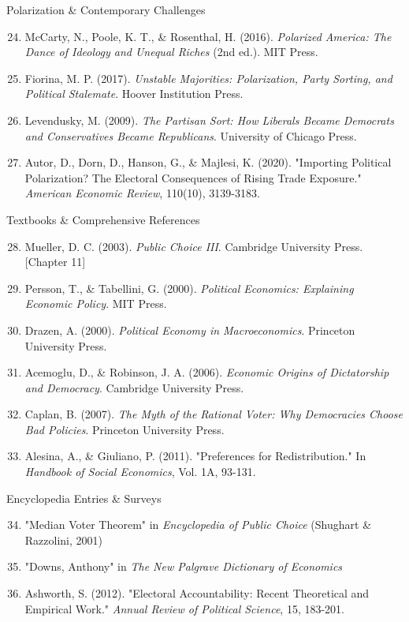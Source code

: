 \documentclass[10pt]{beamer}
\begin{document}
\begin{frame}{Polarization \& Contemporary Challenges}
\footnotesize
\begin{enumerate}
\setcounter{enumi}{23}
\item McCarty, N., Poole, K. T., \& Rosenthal, H. (2016). \emph{Polarized America: The Dance of Ideology and Unequal Riches} (2nd ed.). MIT Press.
\item Fiorina, M. P. (2017). \emph{Unstable Majorities: Polarization, Party Sorting, and Political Stalemate}. Hoover Institution Press.
\item Levendusky, M. (2009). \emph{The Partisan Sort: How Liberals Became Democrats and Conservatives Became Republicans}. University of Chicago Press.
\item Autor, D., Dorn, D., Hanson, G., \& Majlesi, K. (2020). "Importing Political Polarization? The Electoral Consequences of Rising Trade Exposure." \emph{American Economic Review}, 110(10), 3139-3183.
\end{enumerate}
\end{frame}

\begin{frame}{Textbooks \& Comprehensive References}
\footnotesize
\begin{enumerate}
\setcounter{enumi}{27}
\item Mueller, D. C. (2003). \emph{Public Choice III}. Cambridge University Press. [Chapter 11]
\item Persson, T., \& Tabellini, G. (2000). \emph{Political Economics: Explaining Economic Policy}. MIT Press.
\item Drazen, A. (2000). \emph{Political Economy in Macroeconomics}. Princeton University Press.
\item Acemoglu, D., \& Robinson, J. A. (2006). \emph{Economic Origins of Dictatorship and Democracy}. Cambridge University Press.
\item Caplan, B. (2007). \emph{The Myth of the Rational Voter: Why Democracies Choose Bad Policies}. Princeton University Press.
\item Alesina, A., \& Giuliano, P. (2011). "Preferences for Redistribution." In \emph{Handbook of Social Economics}, Vol. 1A, 93-131.
\end{enumerate}
\end{frame}

\begin{frame}{Encyclopedia Entries \& Surveys}
\footnotesize
\begin{enumerate}
\setcounter{enumi}{33}
\item "Median Voter Theorem" in \emph{Encyclopedia of Public Choice} (Shughart \& Razzolini, 2001)
\item "Downs, Anthony" in \emph{The New Palgrave Dictionary of Economics}
\item Ashworth, S. (2012). "Electoral Accountability: Recent Theoretical and Empirical Work." \emph{Annual Review of Political Science}, 15, 183-201.
\end{enumerate}
\end{frame}
\end{document}
